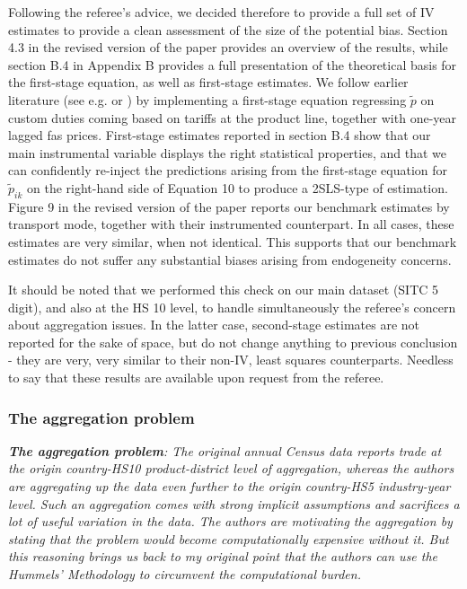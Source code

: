 \documentclass[a4paper,11pt]{article}
\begin{document}
\begin{itemize}
\begin{enumerate}
\begin{table}[htbp]
Following the referee's advice, we decided therefore to provide a full set of IV estimates to provide a clean assessment of the size of the potential bias. Section 4.3 in the revised version of the paper provides an overview of the results, while section B.4 in Appendix B provides a full presentation of the theoretical basis for the first-stage equation, as well as first-stage estimates. We follow earlier literature (see e.g. \citealp{Caliendo_Parro_2015} or \citealp{Lashkaripour-2017}) by implementing a first-stage equation regressing $\widetilde{p}$ on custom duties coming based on tariffs at the product line, together with one-year lagged fas prices. First-stage estimates reported in section B.4 show that our main instrumental variable displays the right statistical properties, and that we can confidently re-inject the predictions arising from the first-stage equation for $\widetilde{p}_{ik}$ on the right-hand side of Equation 10 to produce a 2SLS-type of estimation. Figure 9 in the revised version of the paper reports our benchmark estimates by transport mode, together with their instrumented counterpart. In all cases, these estimates are very similar, when not identical. This supports that our benchmark estimates do not suffer any substantial biases arising from endogeneity concerns.

It should be noted that we performed this check on our main dataset (SITC 5 digit), and also at the HS 10 level, to handle simultaneously the referee's concern about aggregation issues. In the latter case, second-stage estimates are not reported for the sake of space, but do not change anything to previous conclusion - they are very, very similar to their non-IV, least squares counterparts. Needless to say that these results are available upon request from the referee.


\subsubsection{The aggregation problem}

\textit{\textbf{The aggregation problem}: The original annual Census data reports
trade at the origin country-HS10 product-district level of aggregation,
whereas the authors are aggregating up the data even further to the origin
country-HS5 industry-year level. Such an aggregation comes with strong implicit assumptions and sacrifices a lot of useful variation in the data.
The authors are motivating the aggregation by stating that the problem
would become computationally expensive without it. But this reasoning
brings us back to my original point that the authors can use the Hummels'
Methodology to circumvent the computational burden.}


\end{table}
\end{enumerate}
\end{itemize}
\end{document}
